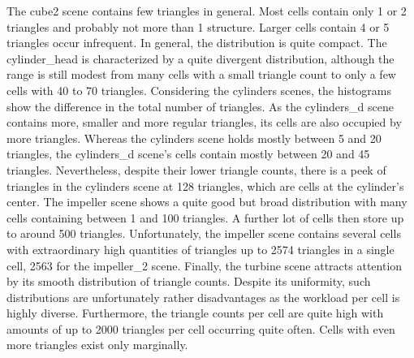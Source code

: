 %
The cube2 scene contains few triangles in general.
Most cells contain only 1 or 2 triangles and probably not more than 1 structure.
Larger cells contain 4 or 5 triangles occur infrequent.
In general, the distribution is quite compact.
%
The cylinder\_head is characterized by a quite divergent distribution, although the range is still modest from many cells with a small triangle count to only a few cells with 40 to 70 triangles.
%
Considering the cylinders scenes, the histograms show the difference in the total number of triangles.
As the cylinders\_d scene contains more, smaller and more regular triangles, its cells are also occupied by more triangles.
Whereas the cylinders scene holds mostly between 5 and 20 triangles, the cylinders\_d scene's cells contain mostly between 20 and 45 triangles.
Nevertheless, despite their lower triangle counts, there is a peek of triangles in the cylinders scene at 128 triangles, which are cells at the cylinder's center.
%
The impeller scene shows a quite good but broad distribution with many cells containing between 1 and 100 triangles.
A further lot of cells then store up to around 500 triangles.
Unfortunately, the impeller scene contains several cells with extraordinary high quantities of triangles up to 2574 triangles in a single cell, 2563 for the impeller\_2 scene.
%
Finally, the turbine scene attracts attention by its smooth distribution of triangle counts.
Despite its uniformity, such distributions are unfortunately rather disadvantages as the workload per cell is highly diverse.
Furthermore, the triangle counts per cell are quite high with amounts of up to 2000 triangles per cell occurring quite often.
Cells with even more triangles exist only marginally.

